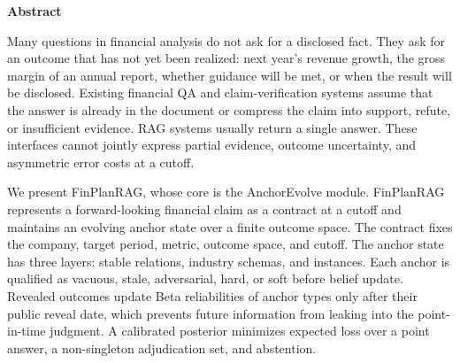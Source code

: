 \documentclass[12pt,openany]{ctexbook}
\begin{document}
\clearpage
{}
{}
\begin{center}{\arial\bfseries{} Abstract\par}\end{center}
\vspace{0.6cm}
{\arial{}\selectfont\sloppy
\setlength{\parindent}{0pt}
\setlength{\emergencystretch}{3em}
\hspace*{2em}Many questions in financial analysis do not ask for a disclosed fact. They ask for an outcome that has not yet been realized: next year's revenue growth, the gross margin of an annual report, whether guidance will be met, or when the result will be disclosed. Existing financial QA and claim-verification systems assume that the answer is already in the document or compress the claim into support, refute, or insufficient evidence. RAG systems usually return a single answer. These interfaces cannot jointly express partial evidence, outcome uncertainty, and asymmetric error costs at a cutoff.\par
\hspace*{2em}We present FinPlanRAG, whose core is the AnchorEvolve module. FinPlanRAG represents a forward-looking financial claim as a contract at a cutoff and maintains an evolving anchor state over a finite outcome space. The contract fixes the company, target period, metric, outcome space, and cutoff. The anchor state has three layers: stable relations, industry schemas, and instances. Each anchor is qualified as vacuous, stale, adversarial, hard, or soft before belief update. Revealed outcomes update Beta reliabilities of anchor types only after their public reveal date, which prevents future information from leaking into the point-in-time judgment. A calibrated posterior minimizes expected loss over a point answer, a non-singleton adjudication set, and abstention.\par
}
\end{document}
